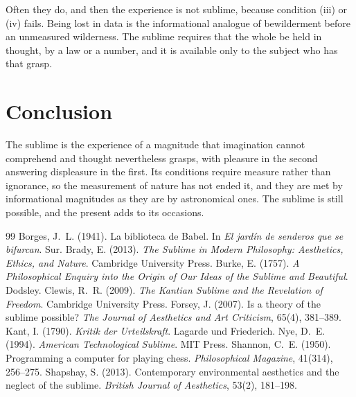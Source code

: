 \documentclass{situationist-preprint}
\begin{document}
\begin{reply}
Often they do, and then the experience is not sublime, because condition (iii) or (iv) fails. Being lost in data is the informational analogue of bewilderment before an unmeasured wilderness. The sublime requires that the whole be held in thought, by a law or a number, and it is available only to the subject who has that grasp.
\end{reply}

\section{Conclusion}

The sublime is the experience of a magnitude that imagination cannot comprehend and thought nevertheless grasps, with pleasure in the second answering displeasure in the first. Its conditions require measure rather than ignorance, so the measurement of nature has not ended it, and they are met by informational magnitudes as they are by astronomical ones. The sublime is still possible, and the present adds to its occasions.

\begin{thebibliography}{99}\small
{} Borges, J.~L. (1941). La biblioteca de Babel. In \emph{El jard\'in de senderos que se bifurcan}. Sur.
 Brady, E. (2013). \emph{The Sublime in Modern Philosophy: Aesthetics, Ethics, and Nature}. Cambridge University Press.
 Burke, E. (1757). \emph{A Philosophical Enquiry into the Origin of Our Ideas of the Sublime and Beautiful}. Dodsley.
 Clewis, R.~R. (2009). \emph{The Kantian Sublime and the Revelation of Freedom}. Cambridge University Press.
 Forsey, J. (2007). Is a theory of the sublime possible? \emph{The Journal of Aesthetics and Art Criticism}, 65(4), 381--389.
 Kant, I. (1790). \emph{Kritik der Urteilskraft}. Lagarde und Friederich.
 Nye, D.~E. (1994). \emph{American Technological Sublime}. MIT Press.
 Shannon, C.~E. (1950). Programming a computer for playing chess. \emph{Philosophical Magazine}, 41(314), 256--275.
 Shapshay, S. (2013). Contemporary environmental aesthetics and the neglect of the sublime. \emph{British Journal of Aesthetics}, 53(2), 181--198.
\end{thebibliography}
\end{document}
